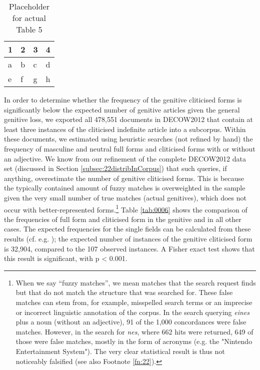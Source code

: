 \begin{table}
	\centering
	\begin{tabular}{llll}
		\toprule
		\textbf{1} & \textbf{2} & \textbf{3} & \textbf{4} \\
		\midrule
		a & b & c & d \\
		e & f & g & h \\
		\bottomrule
	\end{tabular}
	\caption{Placeholder for actual Table 5}
	\label{tab:0005}
\end{table}

In order to determine whether the frequency of the genitive cliticised forms is significantly below the expected number of genitive articles given the general genitive loss, we exported all 478,551 documents in DECOW2012 that contain at least three instances of the cliticised indefinite article into a subcorpus.
Within these documents, we estimated using heuristic searches (not refined by hand) the frequency of masculine and neutral full forms and cliticised forms with or without an adjective.
We know from our refinement of the complete DECOW2012 data set (discussed in Section \ref{subsec:22distribInCorpus}) that such queries, if anything, overestimate the number of genitive cliticised forms.
This is because the typically contained amount of fuzzy matches is overweighted in the sample given the very small number of true matches (actual genitives), which does not occur with better-represented forms.\footnote{
	When we say ``fuzzy matches'', we mean matches that the search request finds but that do not match the structure that was searched for. 
	These false matches can stem from, for example, misspelled search terms or an imprecise or incorrect linguistic annotation of the corpus.
	In the search querying \textit{eines} plus a noun (without an adjective), 91 of the 1,000 concordances were false matches.
	However, in the search for \textit{nes}, where 662 hits were returned, 649 of those were false matches, mostly in the form of acronyms (e.g. the "Nintendo Entertainment System").
	The very clear statistical result is thus not noticeably falsified (see also Footnote \ref{fn:22}).}%
Table \ref{tab:0006} shows the comparison of the frequencies of full form and cliticised form in the genitive and in all other cases.
The expected frequencies for the single fields can be calculated from these results (cf. e.g. \citealt[170]{Gries2008}); the expected number of instances of the genitive cliticised form is 32,904, compared to the 107 observed instances.
A Fisher exact test shows that this result is significant, with p < 0.001.
